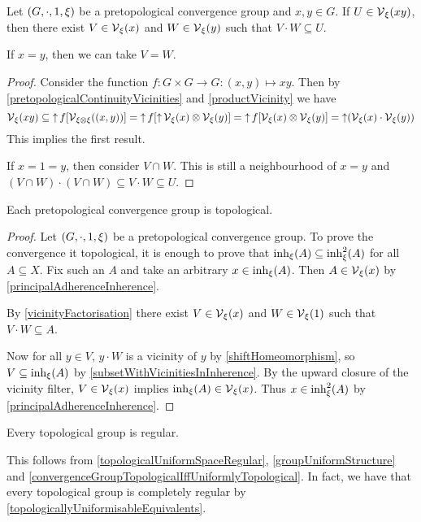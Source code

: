 \begin{lemma} \label{vicinityFactorisation}
Let $\sSet{G,\cdot, 1, \xi}$ be a pretopological convergence group and $x,y\in G$. If $U\in \operatorname{\mathcal{V}}_\xi(xy)$, then there exist $V\in \operatorname{\mathcal{V}}_\xi(x)$ and $W\in \operatorname{\mathcal{V}}_\xi(y)$ such that $V\cdot W\subseteq U$.

If $x=y$, then we can take $V = W$.
\end{lemma}
\begin{proof}
Consider the function $f: G\times G \to G: (x,y)\mapsto xy$. Then by \ref{pretopologicalContinuityVicinities} and \ref{productVicinity} we have
\[ \operatorname{\mathcal{V}}_\xi(xy) \subseteq \operatorname{\uparrow} f[\operatorname{\mathcal{V}}_{\xi\otimes\xi}((x,y))] = \operatorname{\uparrow} f[\operatorname{\uparrow} \operatorname{\mathcal{V}}_\xi(x)\otimes \operatorname{\mathcal{V}}_\xi(y)] = \operatorname{\uparrow} f[\operatorname{\mathcal{V}}_\xi(x)\otimes \operatorname{\mathcal{V}}_\xi(y)] = \operatorname{\uparrow} (\operatorname{\mathcal{V}}_\xi(x)\cdot \operatorname{\mathcal{V}}_\xi(y)) \]
This implies the first result.

If $x=1=y$, then consider $V\cap W$. This is still a neighbourhood of $x=y$ and $(V\cap W)\cdot(V\cap W) \subseteq V\cdot W \subseteq U$.
\end{proof}

\begin{proposition} \label{pretopologicalGroupConvergence}
Each pretopological convergence group is topological.
\end{proposition}
\begin{proof}
Let $\sSet{G,\cdot, 1, \xi}$ be a pretopological convergence group. To prove the convergence it topological, it is enough to prove that $\operatorname{inh}_\xi(A) \subseteq \operatorname{inh}^2_\xi(A)$ for all $A\subseteq X$. Fix such an $A$ and take an arbitrary $x\in \operatorname{inh}_\xi(A)$. Then $A\in \operatorname{\mathcal{V}}_\xi(x)$ by \ref{principalAdherenceInherence}.

By \ref{vicinityFactorisation} there exist $V\in \operatorname{\mathcal{V}}_\xi(x)$ and $W\in\operatorname{\mathcal{V}}_\xi(1)$ such that $V\cdot W \subseteq A$.

Now for all $y\in V$, $y\cdot W$ is a vicinity of $y$ by \ref{shiftHomeomorphism}, so $V \subseteq \operatorname{inh}_\xi(A)$ by \ref{subsetWithVicinitiesInInherence}. By the upward closure of the vicinity filter, $V\in \operatorname{\mathcal{V}}_\xi(x)$ implies $\operatorname{inh}_\xi(A) \in \operatorname{\mathcal{V}}_\xi(x)$. Thus $x\in \operatorname{inh}_\xi^2(A)$ by \ref{principalAdherenceInherence}.
\end{proof}

\begin{proposition} \label{topologicalGroupsRegular}
Every topological group is regular.
\end{proposition}
This follows from \ref{topologicalUniformSpaceRegular}, \ref{groupUniformStructure} and \ref{convergenceGroupTopologicalIffUniformlyTopological}.
In fact, we have that every topological group is completely regular by \ref{topologicallyUniformisableEquivalents}.

